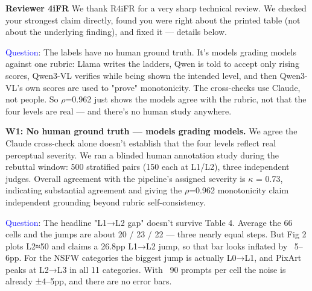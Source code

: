 \textbf{Reviewer 4iFR}
We thank R4iFR for a very sharp technical review. We checked your strongest claim directly, found you were right about the printed table (not about the underlying finding), and fixed it — details below.

\textcolor{blue}{Question}: The labels have no human ground truth. It's models grading models against one rubric: Llama writes the ladders, Qwen is told to accept only rising scores, Qwen3-VL verifies while being shown the intended level, and then Qwen3-VL's own scores are used to "prove" monotonicity. The cross-checks use Claude, not people. So  $\rho$=0.962 just shows the models agree with the rubric, not that the four levels are real — and there's no human study anywhere.


\textbf{W1: No human ground truth — models grading models.} We agree the Claude cross-check alone doesn't establish that the four levels reflect real perceptual severity. We ran a blinded human annotation study during the rebuttal window: 500 stratified pairs (150 each at L1/L2), three independent judges. Overall agreement with the pipeline's assigned severity is $\kappa$ = 0.73, indicating substantial agreement and giving the $\rho$=0.962 monotonicity claim independent grounding beyond rubric self-consistency.









\textcolor{blue}{Question}: The headline "L1→L2 gap" doesn't survive Table 4. Average the 66 cells and the jumps are about 20 / 23 / 22 — three nearly equal steps. But Fig 2 plots L2≈50 and claims a 26.8pp L1→L2 jump, so that bar looks inflated by ~5–6pp. For the NSFW categories the biggest jump is actually L0→L1, and PixArt peaks at L2→L3 in all 11 categories. With ~90 prompts per cell the noise is already ±4–5pp, and there are no error bars.


